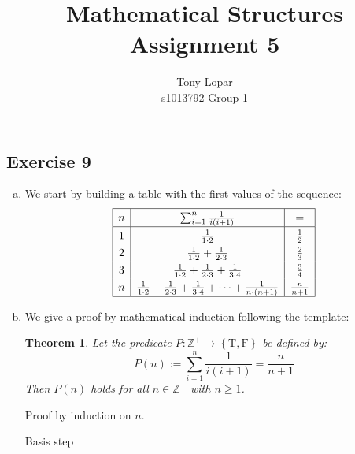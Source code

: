 \documentclass[a4paper]{article}
\title{Mathematical Structures\\Assignment 5}
\author{Tony Lopar \\ s1013792 \quad Group 1}
\newcommand{\exerciseenum}[2]{\subsection*{Exercise #1}{\begin{enumerate}[a)]#2\end{enumerate}}}
\newcommand{\set}[1]{\ensuremath{\left\{{#1}\right\}}}
\newcommand{\ZZp}{\ensuremath{\mathbb{Z}^{+}}}
\newcommand{\Tt}{\ensuremath{\mathrm T}}
\newcommand{\Ff}{\ensuremath{\mathrm F}}
\newtheorem{theorem}{Theorem}
\newcommand{\templtag}[1]{\marginpar{\fbox{#1}}}
\begin{document}
\maketitle


\exerciseenum{9}{%
\item%
We start by building a table with the first values of the sequence:
\[
\renewcommand*{\arraystretch}{1.3}
\begin{array}{|c|c|c|}
\hline
n & {\sum_{i=1}^n \frac{1}{i(i+1)}} & = \\
\hline
1 & \frac{1}{1\cdot 2}  & \frac{1}{2}      \\
2 & \frac{1}{1\cdot 2}+\frac{1}{2\cdot 3} & \frac{2}{3}       \\
3 & \frac{1}{1\cdot 2}+\frac{1}{2\cdot 3}+\frac{1}{3\cdot 4} & \frac{3}{4} \\
n & \frac{1}{1\cdot 2}+\frac{1}{2\cdot 3}+\frac{1}{3\cdot 4}+\dots+\frac{1}{n \cdot (n+1)} & \frac{n}{n+1} \\
\hline
\end{array}
\]

\item%
We give a proof by mathematical induction following the template:
\setcounter{theorem}{8}%
\begin{theorem}
Let \templtag{1}%
the predicate $P:\ZZp\to\set{\Tt,\Ff}$ be defined by:
\[
P(n) := \sum_{i=1}^n \frac{1}{i(i+1)}= \frac{n}{n+1}
\]
Then $P(n)$ holds for all $n\in\ZZp$ with $n\geq 1$.
\end{theorem}

Proof \templtag{2}%
by induction on $n$.
\begin{description}
\item[Basis step]~\templtag{3}\\


\end{description}}
\end{document}
